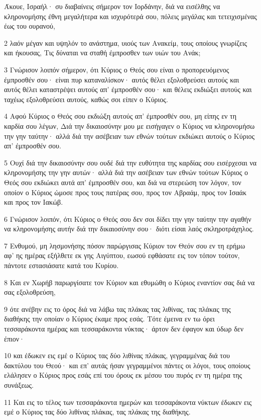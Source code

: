 \par Άκουε, Ισραήλ· συ διαβαίνεις σήμερον τον Ιορδάνην, διά να εισέλθης να κληρονομήσης έθνη μεγαλήτερα και ισχυρότερά σου, πόλεις μεγάλας και τετειχισμένας έως του ουρανού,
\par 2 λαόν μέγαν και υψηλόν το ανάστημα, υιούς των Ανακείμ, τους οποίους γνωρίζεις και ήκουσας, Τις δύναται να σταθή έμπροσθεν των υιών του Ανάκ;
\par 3 Γνώρισον λοιπόν σήμερον, ότι Κύριος ο Θεός σου είναι ο προπορευόμενος έμπροσθέν σου· είναι πυρ καταναλίσκον· αυτός θέλει εξολοθρεύσει αυτούς και αυτός θέλει καταστρέψει αυτούς απ' έμπροσθέν σου· και θέλεις εκδιώξει αυτούς και ταχέως εξολοθρεύσει αυτούς, καθώς σοι είπεν ο Κύριος.
\par 4 Αφού Κύριος ο Θεός σου εκδιώξη αυτούς απ' έμπροσθέν σου, μη είπης εν τη καρδία σου λέγων, Διά την δικαιοσύνην μου με εισήγαγεν ο Κύριος να κληρονομήσω την γην ταύτην· αλλά διά την ασέβειαν των εθνών τούτων εκδιώκει αυτούς ο Κύριος απ' έμπροσθέν σου.
\par 5 Ουχί διά την δικαιοσύνην σου ουδέ διά την ευθύτητα της καρδίας σου εισέρχεσαι να κληρονομήσης την γην αυτών· αλλά διά την ασέβειαν των εθνών τούτων Κύριος ο Θεός σου εκδιώκει αυτά απ' έμπροσθέν σου, και διά να στερεώση τον λόγον, τον οποίον ο Κύριος ώμοσε προς τους πατέρας σου, προς τον Αβραάμ, προς τον Ισαάκ και προς τον Ιακώβ.
\par 6 Γνώρισον λοιπόν, ότι Κύριος ο Θεός σου δεν σοι δίδει την γην ταύτην την αγαθήν να κληρονομήσης αυτήν διά την δικαιοσύνην σου· διότι είσαι λαός σκληροτράχηλος.
\par 7 Ενθυμού, μη λησμονήσης πόσον παρώργισας Κύριον τον Θεόν σου εν τη ερήμω αφ' ης ημέρας εξήλθετε εκ γης Αιγύπτου, εωσού εφθάσατε εις τον τόπον τούτον, πάντοτε εστασιάσατε κατά του Κυρίου.
\par 8 Και εν Χωρήβ παρωργίσατε τον Κύριον και εθυμώθη ο Κύριος εναντίον σας διά να σας εξολοθρεύση,
\par 9 ότε ανέβην εις το όρος διά να λάβω τας πλάκας τας λιθίνας, τας πλάκας της διαθήκης την οποίαν ο Κύριος έκαμε προς εσάς. Τότε έμεινα εν τω όρει τεσσαράκοντα ημέρας και τεσσαράκοντα νύκτας· άρτον δεν έφαγον και ύδωρ δεν έπιον·
\par 10 και έδωκεν εις εμέ ο Κύριος τας δύο λιθίνας πλάκας, γεγραμμένας διά του δακτύλου του Θεού· και επ' αυτάς ήσαν γεγραμμένοι πάντες οι λόγοι, τους οποίους ελάλησεν ο Κύριος προς εσάς επί του όρους εκ μέσου του πυρός εν τη ημέρα της συνάξεως.
\par 11 Και εις το τέλος των τεσσαράκοντα ημερών και τεσσαράκοντα νύκτων έδωκεν εις εμέ ο Κύριος τας δύο λιθίνας πλάκας, τας πλάκας της διαθήκης.
